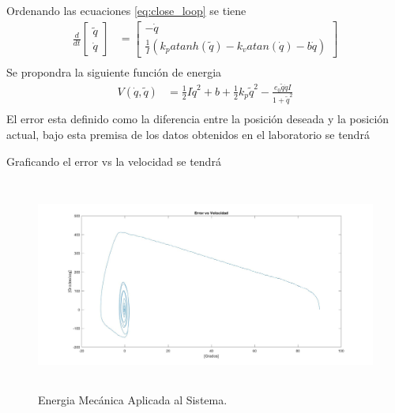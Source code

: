 \documentclass[12pt]{article}
\begin{document}
\begin{enumerate}
\begin{enumerate}
\begin{equation}
        \end{equation}
        Ordenando las ecuaciones \ref{eq:close_loop} se tiene
        \begin{equation}
            \begin{split}
                \frac{d}{dt}
                \begin{bmatrix}
                    \tilde{q} \\
                    \dot{q}
                \end{bmatrix}&=
                \begin{bmatrix}
                    -\dot{q}\\
                    \frac{1}{I}(k_p atanh(\tilde{q})-k_v atan(\dot{q})-b\dot{q})
                \end{bmatrix}\\
            \end{split}
            \label{eq:din_model}
        \end{equation}
        Se propondra la siguiente función de energia
        \begin{equation}
            \begin{split}
                V(\dot{q},\tilde{q})&=\frac{1}{2}I\dot{q}^2+b+\frac{1}{2}k_p\tilde{q}^2-\frac{e_0\tilde{q}\dot{q}I}{1+\tilde{q}^2}\\
            \end{split}
            \label{eq:energia}
        \end{equation}
        El error esta definido como la diferencia entre la posición deseada y la posición actual, bajo esta premisa de los datos obtenidos en el laboratorio se tendrá
        
        

        Graficando el error vs la velocidad se tendrá

        \begin{figure}[h]
            \centering
            \includegraphics[width=15cm, height=7cm]{IMAGENES/5.jpg}
            \caption{Energia Mecánica Aplicada al Sistema.}
            \label{fig:energia}
        \end{figure}


\end{enumerate}
\end{enumerate}
\end{document}
